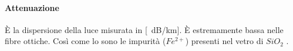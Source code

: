 \documentclass[a5paper,12pt]{article}
\newcommand{\e}{\`E\xspace}  %
\begin{document}
\paragraph{Attenuazione} \e la dispersione della luce misurata in [\SI{}{dB/km}]. \e estremamente bassa nelle fibre ottiche. Così come lo sono le impurità ($Fe^{2+ }$) presenti nel vetro di $SiO_2$ .



\nocite{slide}%
\nocite{smith}



       
    
\end{document}

